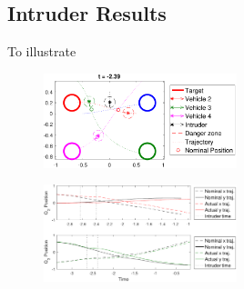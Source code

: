 \subsection{Intruder Results \label{sec:basic_results}}

To illustrate 

\begin{figure}
  \centering
  \includegraphics[width=0.50\textwidth]{"fig/intruder1_traj"}
  \caption{}
  \label{fig:intruder1_traj}
\end{figure}

\begin{figure}
  \centering
  \includegraphics[width=0.50\textwidth]{"fig/intruder1_diff"}
  \caption{}
  \label{fig:intruder1_diff}
\end{figure}